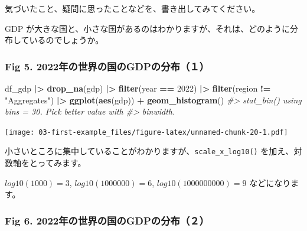 \documentclass[
  xelatex, ja=standard]{bxjsbook}
\newenvironment{Shaded}{\begin{snugshade}}{\end{snugshade}}
\newcommand{\CommentTok}[1]{\textcolor[rgb]{0.56,0.35,0.01}{\textit{#1}}}
\newcommand{\DecValTok}[1]{\textcolor[rgb]{0.00,0.00,0.81}{#1}}
\newcommand{\FunctionTok}[1]{\textcolor[rgb]{0.13,0.29,0.53}{\textbf{#1}}}
\newcommand{\NormalTok}[1]{#1}
\newcommand{\SpecialCharTok}[1]{\textcolor[rgb]{0.81,0.36,0.00}{\textbf{#1}}}
\newcommand{\StringTok}[1]{\textcolor[rgb]{0.31,0.60,0.02}{#1}}
\theoremstyle{definition}
\theoremstyle{definition}
\theoremstyle{definition}
\theoremstyle{definition}
\theoremstyle{remark}
\begin{document}
気づいたこと、疑問に思ったことなどを、書き出してみてください。

GDP が大きな国と、小さな国があるのはわかりますが、それは、どのように分布しているのでしょうか。

\hypertarget{fig-5.-2022ux5e74ux306eux4e16ux754cux306eux56fdux306egdpux306eux5206ux5e03uxff11}{%
\subsubsection{Fig 5. 2022年の世界の国のGDPの分布（１）}\label{fig-5.-2022ux5e74ux306eux4e16ux754cux306eux56fdux306egdpux306eux5206ux5e03uxff11}}

\begin{Shaded}
\begin{Highlighting}[]
\NormalTok{df\_gdp }\SpecialCharTok{|\textgreater{}} \FunctionTok{drop\_na}\NormalTok{(gdp) }\SpecialCharTok{|\textgreater{}} 
  \FunctionTok{filter}\NormalTok{(year }\SpecialCharTok{==} \DecValTok{2022}\NormalTok{) }\SpecialCharTok{|\textgreater{}} \FunctionTok{filter}\NormalTok{(region }\SpecialCharTok{!=} \StringTok{"Aggregates"}\NormalTok{) }\SpecialCharTok{|\textgreater{}}
  \FunctionTok{ggplot}\NormalTok{(}\FunctionTok{aes}\NormalTok{(gdp)) }\SpecialCharTok{+} \FunctionTok{geom\_histogram}\NormalTok{()}
\CommentTok{\#\textgreater{} \textasciigrave{}stat\_bin()\textasciigrave{} using \textasciigrave{}bins = 30\textasciigrave{}. Pick better value with}
\CommentTok{\#\textgreater{} \textasciigrave{}binwidth\textasciigrave{}.}
\end{Highlighting}
\end{Shaded}

\texttt{[image: 03-first-example\_files/figure-latex/unnamed-chunk-20-1.pdf]}

小さいところに集中していることがわかりますが、\texttt{scale\_x\_log10()} を加え、対数軸をとってみます。

\(log10(1000) = 3\), \(log10(1000000) = 6\), \(log10(1000000000) = 9\) などになります。

\hypertarget{fig-6.-2022ux5e74ux306eux4e16ux754cux306eux56fdux306egdpux306eux5206ux5e03uxff12}{%
\subsubsection{Fig 6. 2022年の世界の国のGDPの分布（２）}\label{fig-6.-2022ux5e74ux306eux4e16ux754cux306eux56fdux306egdpux306eux5206ux5e03uxff12}}
\end{document}
